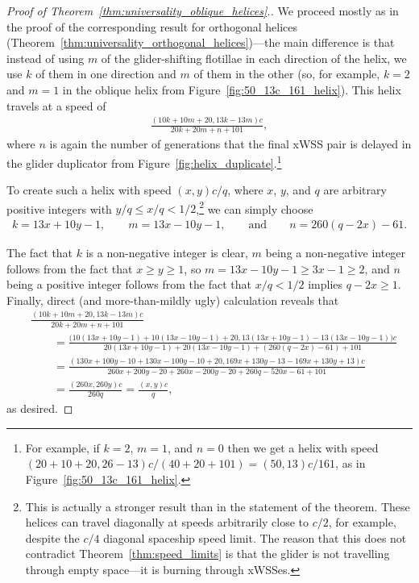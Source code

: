 \begin{proof}[Proof of Theorem~\ref{thm:universality_oblique_helices}.]
	We proceed mostly as in the proof of the corresponding result for orthogonal helices (Theorem~\ref{thm:universality_orthogonal_helices})---the main difference is that instead of using $m$ of the glider-shifting flotillae in each direction of the helix, we use $k$ of them in one direction and $m$ of them in the other (so, for example, $k = 2$ and $m = 1$ in the oblique helix from Figure~\ref{fig:50_13c_161_helix}). This helix travels at a speed of
	\begin{align}\label{eq:oblique_speed_helix}
		\frac{(10k + 10m + 20, 13k - 13m)c}{20k + 20m + n + 101},
	\end{align}
	where $n$ is again the number of generations that the final xWSS pair is delayed in the glider duplicator from Figure~\ref{fig:helix_duplicate}.\footnote{For example, if $k = 2$, $m = 1$, and $n = 0$ then we get a helix with speed $(20 + 10 + 20, 26 - 13)c/(40 + 20 + 101) = (50,13)c/161$, as in Figure~\ref{fig:50_13c_161_helix}.}
	
	To create such a helix with speed $(x,y)c/q$, where $x$, $y$, and $q$ are arbitrary positive integers with $y/q \leq x/q < 1/2$,\footnote{This is actually a stronger result than in the statement of the theorem. These helices can travel diagonally at speeds arbitrarily close to $c/2$, for example, despite the $c/4$ diagonal spaceship speed limit. The reason that this does not contradict Theorem~\ref{thm:speed_limits} is that the glider is not travelling through empty space---it is burning through xWSSes.} we can simply choose
	\begin{align*}
		k = 13x + 10y - 1, \qquad m = 13x - 10y - 1, \qquad \text{and} \qquad n = 260(q - 2x) - 61.
	\end{align*}

	The fact that $k$ is a non-negative integer is clear, $m$ being a non-negative integer follows from the fact that $x \geq y \geq 1$, so $m = 13x - 10y - 1 \geq 3x - 1 \geq 2$, and $n$ being a positive integer follows from the fact that $x/q < 1/2$ implies $q - 2x \geq 1$. Finally, direct (and more-than-mildly ugly) calculation reveals that
	\begin{align*}
		& \frac{(10k + 10m + 20, 13k - 13m)c}{20k + 20m + n + 101} \\
		& \qquad = \frac{\big(10(13x + 10y - 1) + 10(13x - 10y - 1) + 20, 13(13x + 10y - 1) - 13(13x - 10y - 1)\big)c}{20(13x + 10y - 1) + 20(13x - 10y - 1) + (260(q - 2x) - 61) + 101} \\
		& \qquad = \frac{(130x + 100y - 10 + 130x - 100y - 10 + 20, 169x + 130y - 13 - 169x + 130y + 13)c}{260x + 200y - 20 + 260x - 200y - 20 + 260q - 520x - 61 + 101} \\
		& \qquad = \frac{(260x, 260y)c}{260q} = \frac{(x,y)c}{q},
	\end{align*}
	as desired.
\end{proof}

